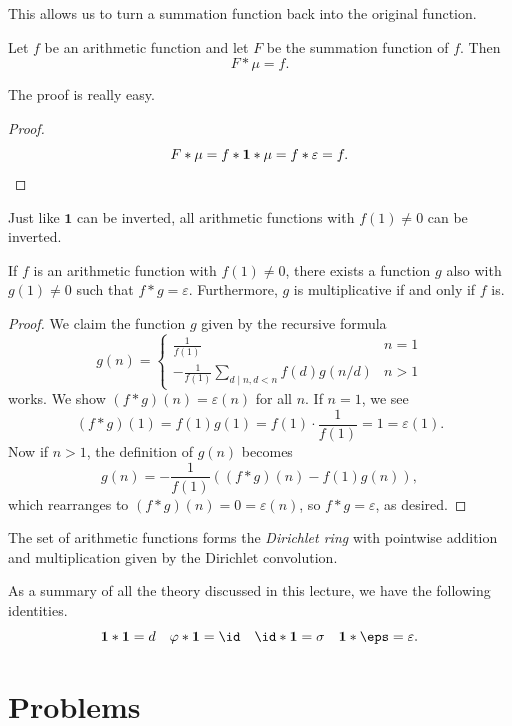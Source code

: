 \documentclass[11pt]{scrartcl}
\begin{document}
This allows us to turn a summation function back into the original function.

\begin{theorem}
	Let $f$ be an arithmetic function and let $F$ be the summation function of $f$. Then
	\[F \ast \mu = f.\]
\end{theorem}

The proof is really easy.

\begin{proof}
	\[F \ast \mu = f \ast \mathbf 1 \ast \mu = f \ast \varepsilon = f. \qedhere\]
\end{proof}

Just like $\mathbf 1$ can be inverted, all arithmetic functions with $f(1) \neq 0$ can be inverted.

\begin{theorem}
	If $f$ is an arithmetic function with $f(1) \neq 0$, there exists a function $g$ also with $g(1) \neq 0$ such that $f \ast g = \varepsilon$. Furthermore, $g$ is multiplicative if and only if $f$ is.
\end{theorem}

\begin{proof}
	We claim the function $g$ given by the recursive formula
	\[g(n) = \begin{cases}
		\frac{1}{f(1)} & n = 1 \\
		-\frac{1}{f(1)}\sum_{d \mid n, d < n}f(d)g(n/d) & n > 1
	\end{cases}\]
	works. We show $(f \ast g)(n) = \varepsilon(n)$ for all $n$. If $n = 1$, we see
	\[(f \ast g)(1) = f(1)g(1) = f(1) \cdot \frac{1}{f(1)} = 1 = \varepsilon(1).\]
	Now if $n > 1$, the definition of $g(n)$ becomes
	\[g(n) = -\frac{1}{f(1)}\left((f \ast g)(n) - f(1)g(n)\right),\]
	which rearranges to $(f \ast g)(n) = 0 = \varepsilon(n)$, so $f \ast g = \varepsilon$, as desired.
\end{proof}

The set of arithmetic functions forms the \emph{Dirichlet ring} with pointwise addition and multiplication given by the Dirichlet convolution.

As a summary of all the theory discussed in this lecture, we have the following identities.
\[\mathbf 1 \ast \mathbf 1 = d \quad \varphi \ast \mathbf 1 = \id \quad \id \ast \mathbf 1 = \sigma \quad \mathbf 1 \ast \eps = \varepsilon.\]

\pagebreak

\section{Problems}
\end{document}
